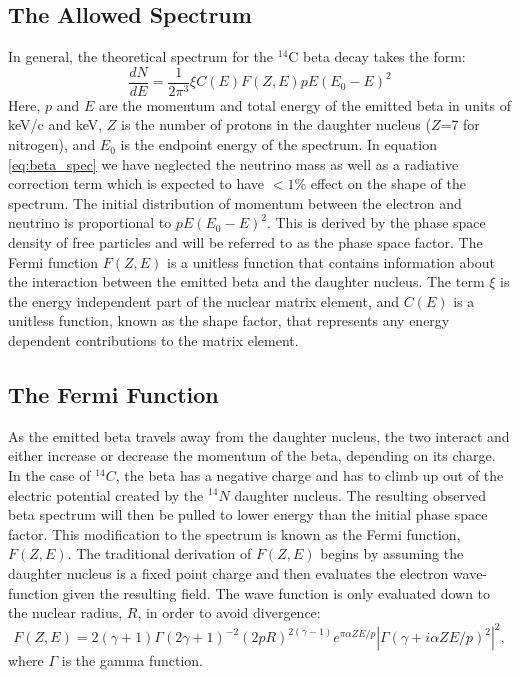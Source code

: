 \subsection{The Allowed Spectrum}
In general, the theoretical spectrum for the $^{14}$C beta decay takes the form\cite{C14_Kuzminov}:
\begin{equation}\label{eq:beta_spec}
\frac{dN}{dE}=\frac{1}{2\pi^3} \xi C(E) F(Z,E) pE(E_0-E)^2
\end{equation}
Here, $p$ and $E$ are the momentum and total energy of the emitted beta in units of keV/c and keV, $Z$ is the number of protons in the daughter nucleus ($Z$=7 for nitrogen), and $E_0$ is the endpoint energy of the spectrum. In equation \ref{eq:beta_spec} we have neglected the neutrino mass as well as a radiative correction term which is expected to have $<1\%$ effect on the shape of the spectrum\cite{C14_Wietfeldt}. The initial distribution of momentum between the electron and neutrino is proportional to $pE(E_0-E)^2$. This is derived by the phase space density of free particles and will be referred to as the phase space factor. The Fermi function $F(Z,E)$ is a unitless function that contains information about the interaction between the emitted beta and the daughter nucleus. The term $\xi$ is the energy independent part of the nuclear matrix element, and  $C(E)$ is a unitless function, known as the shape factor, that represents any energy dependent contributions to the matrix element.

\subsection{The Fermi Function}\label{sec:fermifunc}
As the emitted beta travels away from the daughter nucleus, the two interact and either increase or decrease the momentum of the beta, depending on its charge. In the case of $^{14}C$, the beta has a negative charge and has to climb up out of the electric potential created by the $^{14}N$ daughter nucleus. The resulting observed beta spectrum will then be pulled to lower energy than the initial phase space factor. This modification to the spectrum is known as the Fermi function, $F(Z,E)$. The traditional derivation of $F(Z,E)$ begins by assuming the daughter nucleus is a fixed point charge and then evaluates the electron wave-function given the resulting field. The wave function is only evaluated down to the nuclear radius, $R$, in order to avoid divergence\cite{wilkinson}:
\begin{equation}\label{eq:fermifunc1}
F(Z,E)=2(\gamma+1)\Gamma(2\gamma+1)^{-2}(2pR)^{2(\gamma-1)}e^{\pi \alpha Z E/p}|\Gamma(\gamma+i\alpha ZE/p)^{2}|^2,
\end{equation}
where $\Gamma$ is the gamma function.

